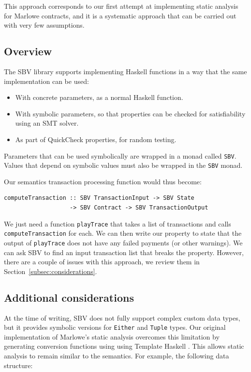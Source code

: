 \documentclass[english,runningheads]{llncs}
\begin{document}
This approach corresponds to our first attempt at implementing static
analysis for Marlowe contracts, and it is a systematic approach that
can be carried out with very few assumptions. 

\subsection{Overview}

The SBV library supports implementing Haskell functions in a way that
the same implementation can be used:
\begin{itemize}
\item With concrete parameters, as a normal Haskell function.
\item With symbolic parameters, so that properties can be checked for satisfiability
using an SMT solver.
\item As part of QuickCheck properties, for random testing.
\end{itemize}
Parameters that can be used symbolically are wrapped in a monad called
\texttt{SBV}. Values that depend on symbolic values must also be wrapped in the \texttt{SBV} monad.


Our semantics transaction processing function would thus become:

\begin{verbatim}
computeTransaction :: SBV TransactionInput -> SBV State
                   -> SBV Contract -> SBV TransactionOutput
\end{verbatim}

We just need a function \texttt{playTrace} that takes a list of
transactions and calls \texttt{computeTransaction} for each. 
We can then write our property to state that the output of
\texttt{playTrace} does not have any failed payments (or other warnings). We
can ask SBV to find an input transaction list that breaks the property.
However, there are a couple of issues with this approach,
we review them in Section~\ref{subsec:considerations}.

\subsection{Additional considerations\label{subsec:considerations}}

At the time of writing, SBV does not fully support complex custom data types,
but it provides symbolic versions for \texttt{Either} and \texttt{Tuple} types.
Our original implementation of Marlowe's static analysis overcomes this limitation
by generating conversion functions using using Template Haskell
\cite{sheard2002template}. This allows static analysis to remain similar to the semantics. For example, the following data structure:
\end{document}
